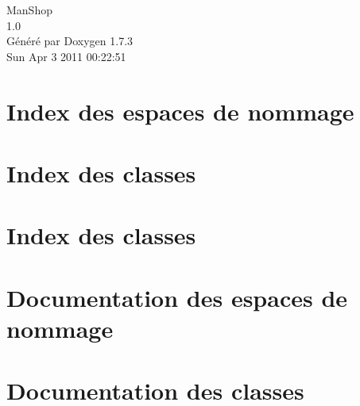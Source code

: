 \documentclass[a4paper]{book}
\begin{document}
\hypersetup{pageanchor=false}
\begin{titlepage}
\vspace*{7cm}
\begin{center}
{\Large ManShop \\[1ex]\large 1.0 }\\
\vspace*{1cm}
{\large Généré par Doxygen 1.7.3}\\
\vspace*{0.5cm}
{\small Sun Apr 3 2011 00:22:51}\\
\end{center}
\end{titlepage}
\clearemptydoublepage
{}
\tableofcontents
\clearemptydoublepage
{}
\hypersetup{pageanchor=true}
\chapter{Index des espaces de nommage}

\chapter{Index des classes}

\chapter{Index des classes}

\chapter{Documentation des espaces de nommage}


\chapter{Documentation des classes}



























\printindex
\end{document}
